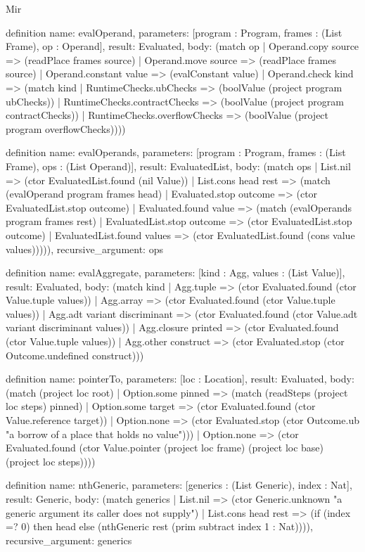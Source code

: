 \begin{lexlean}{Mir}
\begin{semanticmodule}
definition{
  name: evalOperand,
  parameters: [program : Program, frames : (List Frame), op : Operand],
  result: Evaluated,
  body: (match op
    | Operand.copy source => (readPlace frames source)
    | Operand.move source => (readPlace frames source)
    | Operand.constant value => (evalConstant value)
    | Operand.check kind => (match kind
      | RuntimeChecks.ubChecks => (boolValue (project program ubChecks))
      | RuntimeChecks.contractChecks => (boolValue (project program contractChecks))
      | RuntimeChecks.overflowChecks => (boolValue (project program overflowChecks))))
}

definition{
  name: evalOperands,
  parameters: [program : Program, frames : (List Frame), ops : (List Operand)],
  result: EvaluatedList,
  body: (match ops
    | List.nil => (ctor EvaluatedList.found (nil Value))
    | List.cons head rest => (match (evalOperand program frames head)
      | Evaluated.stop outcome => (ctor EvaluatedList.stop outcome)
      | Evaluated.found value => (match (evalOperands program frames rest)
        | EvaluatedList.stop outcome => (ctor EvaluatedList.stop outcome)
        | EvaluatedList.found values => (ctor EvaluatedList.found (cons value values))))),
  recursive_argument: ops
}

definition{
  name: evalAggregate,
  parameters: [kind : Agg, values : (List Value)],
  result: Evaluated,
  body: (match kind
    | Agg.tuple => (ctor Evaluated.found (ctor Value.tuple values))
    | Agg.array => (ctor Evaluated.found (ctor Value.tuple values))
    | Agg.adt variant discriminant => (ctor Evaluated.found (ctor Value.adt variant discriminant values))
    | Agg.closure printed => (ctor Evaluated.found (ctor Value.tuple values))
    | Agg.other construct => (ctor Evaluated.stop (ctor Outcome.undefined construct)))
}

definition{
  name: pointerTo,
  parameters: [loc : Location],
  result: Evaluated,
  body: (match (project loc root)
    | Option.some pinned => (match (readSteps (project loc steps) pinned)
      | Option.some target => (ctor Evaluated.found (ctor Value.reference target))
      | Option.none => (ctor Evaluated.stop (ctor Outcome.ub "a borrow of a place that holds no value")))
    | Option.none => (ctor Evaluated.found (ctor Value.pointer (project loc frame) (project loc base) (project loc steps))))
}

definition{
  name: nthGeneric,
  parameters: [generics : (List Generic), index : Nat],
  result: Generic,
  body: (match generics
    | List.nil => (ctor Generic.unknown "a generic argument its caller does not supply")
    | List.cons head rest => (if (index =? 0) then head else (nthGeneric rest (prim subtract index 1 : Nat)))),
  recursive_argument: generics
}


\end{semanticmodule}
\end{lexlean}
